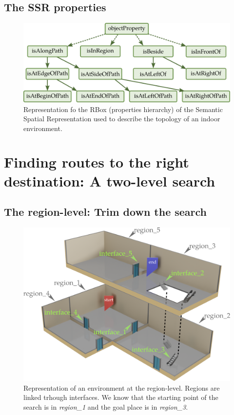 \subsection{The SSR properties}

\begin{figure}[ht!]
\centering
\includegraphics[scale=0.4]{figures/chapter3/ssr_rbox.png}
\caption{\label{fig:chap3_rbox} Representation fo the RBox (properties hierarchy) of the Semantic Spatial Representation used to describe the topology of an indoor environment.}
\end{figure}


\section{Finding routes to the right destination: A two-level search}

\subsection{The region-level: Trim down the search}

\begin{figure}[ht!]
\centering
\includegraphics[scale=0.22]{figures/chapter3/building_regions.png}
\caption{\label{fig:chap3_regions} Representation of an environment at the region-level. Regions are linked trhough interfaces. We know that the starting point of the search is in \textit{region\_1} and the goal place is in \textit{region\_3}. }
\end{figure}


